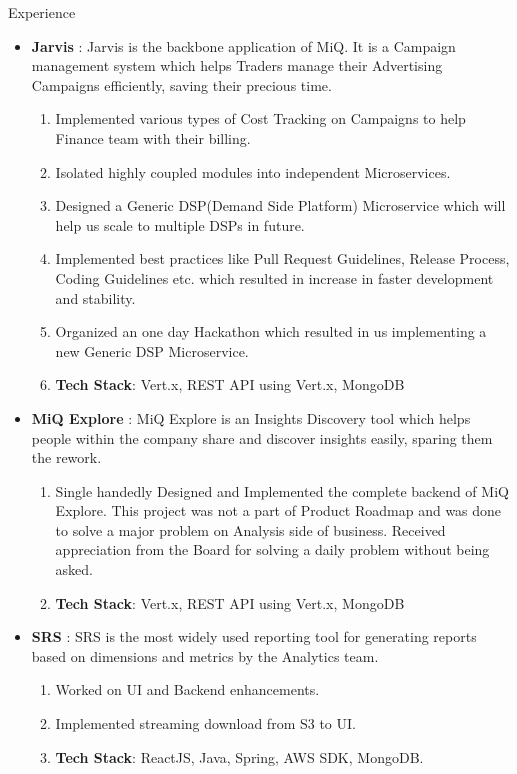 \documentclass{resume} %
\begin{document}
\begin{rSection}{Experience}
\begin{itemize}
    \item {\bf{Jarvis}} : Jarvis is the backbone application of MiQ. It is a Campaign management system which helps Traders manage their Advertising Campaigns efficiently, saving their precious time. 
    \begin{enumerate}
        \item Implemented various types of Cost Tracking on Campaigns to help Finance team with their billing.
        \item Isolated highly coupled modules into independent Microservices.
        \item Designed a Generic DSP(Demand Side Platform) Microservice which will help us scale to multiple DSPs in future.
        \item Implemented best practices like Pull Request Guidelines, Release Process, Coding Guidelines etc. which resulted in increase in faster development and stability.
        \item Organized an one day Hackathon which resulted in us implementing a new Generic DSP Microservice.
        \item {\bf{Tech Stack}}: Vert.x, REST API using Vert.x, MongoDB
    \end{enumerate}
    \item {\bf{MiQ Explore}} : MiQ Explore is an Insights Discovery tool which helps people within the company share and discover insights easily, sparing them the rework.
    \begin{enumerate}
        \item Single handedly Designed and Implemented the complete backend of MiQ Explore. This project was not a part of Product Roadmap and was done to solve a major problem on Analysis side of business. Received appreciation from the Board for solving a daily problem without being asked.
        \item {\bf{Tech Stack}}: Vert.x, REST API using Vert.x, MongoDB
    \end{enumerate}
    \item {\bf{SRS}} : SRS is the most widely used reporting tool for generating reports based on dimensions and metrics by the Analytics team.
    \begin{enumerate}
        \item Worked on UI and Backend enhancements.
        \item Implemented streaming download from S3 to UI.
        \item {\bf{Tech Stack}}: ReactJS, Java, Spring, AWS SDK, MongoDB. 
    \end{enumerate}
\end{itemize}



\end{rSection}
\end{document}
